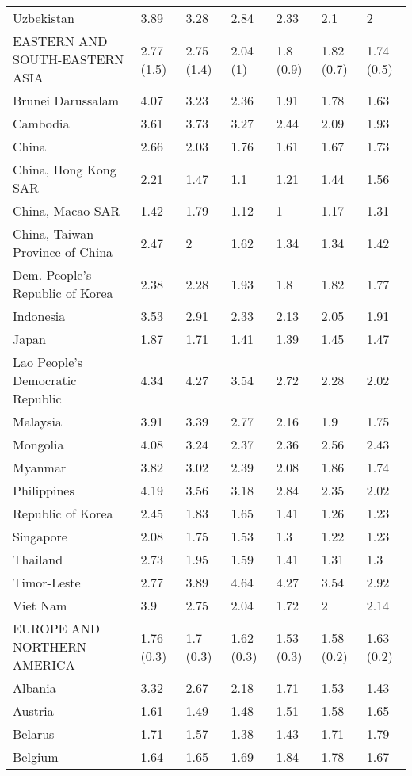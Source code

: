 \begin{longtable}[t]{lllllll}
Uzbekistan & 3.89 & 3.28 & 2.84 & 2.33 & 2.1 & 2\\
EASTERN AND SOUTH-EASTERN ASIA & 2.77 (1.5) & 2.75 (1.4) & 2.04 (1) & 1.8 (0.9) & 1.82 (0.7) & 1.74 (0.5)\\
Brunei Darussalam & 4.07 & 3.23 & 2.36 & 1.91 & 1.78 & 1.63\\
Cambodia & 3.61 & 3.73 & 3.27 & 2.44 & 2.09 & 1.93\\
China & 2.66 & 2.03 & 1.76 & 1.61 & 1.67 & 1.73\\
China, Hong Kong SAR & 2.21 & 1.47 & 1.1 & 1.21 & 1.44 & 1.56\\
China, Macao SAR & 1.42 & 1.79 & 1.12 & 1 & 1.17 & 1.31\\
China, Taiwan Province of China & 2.47 & 2 & 1.62 & 1.34 & 1.34 & 1.42\\
Dem. People's Republic of Korea & 2.38 & 2.28 & 1.93 & 1.8 & 1.82 & 1.77\\
Indonesia & 3.53 & 2.91 & 2.33 & 2.13 & 2.05 & 1.91\\
Japan & 1.87 & 1.71 & 1.41 & 1.39 & 1.45 & 1.47\\
Lao People's Democratic Republic & 4.34 & 4.27 & 3.54 & 2.72 & 2.28 & 2.02\\
Malaysia & 3.91 & 3.39 & 2.77 & 2.16 & 1.9 & 1.75\\
Mongolia & 4.08 & 3.24 & 2.37 & 2.36 & 2.56 & 2.43\\
Myanmar & 3.82 & 3.02 & 2.39 & 2.08 & 1.86 & 1.74\\
Philippines & 4.19 & 3.56 & 3.18 & 2.84 & 2.35 & 2.02\\
Republic of Korea & 2.45 & 1.83 & 1.65 & 1.41 & 1.26 & 1.23\\
Singapore & 2.08 & 1.75 & 1.53 & 1.3 & 1.22 & 1.23\\
Thailand & 2.73 & 1.95 & 1.59 & 1.41 & 1.31 & 1.3\\
Timor-Leste & 2.77 & 3.89 & 4.64 & 4.27 & 3.54 & 2.92\\
Viet Nam & 3.9 & 2.75 & 2.04 & 1.72 & 2 & 2.14\\
EUROPE AND NORTHERN AMERICA & 1.76 (0.3) & 1.7 (0.3) & 1.62 (0.3) & 1.53 (0.3) & 1.58 (0.2) & 1.63 (0.2)\\
Albania & 3.32 & 2.67 & 2.18 & 1.71 & 1.53 & 1.43\\
Austria & 1.61 & 1.49 & 1.48 & 1.51 & 1.58 & 1.65\\
Belarus & 1.71 & 1.57 & 1.38 & 1.43 & 1.71 & 1.79\\
Belgium & 1.64 & 1.65 & 1.69 & 1.84 & 1.78 & 1.67\\

\end{longtable}
